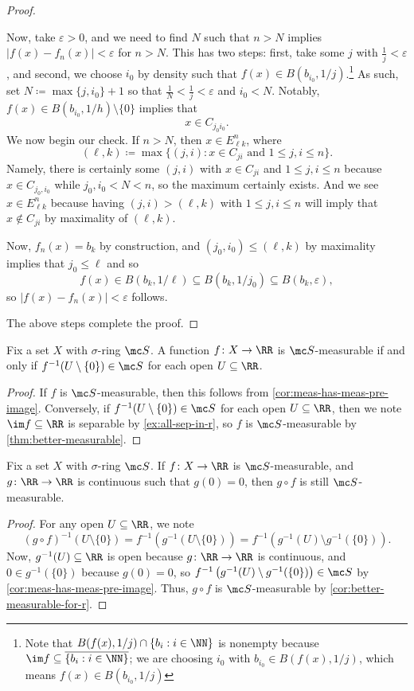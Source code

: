 \documentclass[../notes.tex]{subfiles}
\begin{document}
\begin{proof}
\begin{enumerate}
		Now, take $\varepsilon>0$, and we need to find $N$ such that $n>N$ implies $|f(x)-f_n(x)|<\varepsilon$ for $n>N$. This has two steps: first, take some $j$ with $\frac1j<\varepsilon$, and second, we choose $i_0$ by density such that $f(x)\in B(b_{i_0},1/j)$.\footnote{Note that $B(f(x),1/j)\cap\{b_i:i\in\NN\}$ is nonempty because $\im f\subseteq\overline{\{b_i:i\in\NN\}}$; we are choosing $i_0$ with $b_{i_0}\in B(f(x),1/j)$, which means $f(x)\in B(b_{i_0},1/j)$} As such, set $N\coloneqq\max\{j,i_0\}+1$ so that $\frac1N<\frac1j<\varepsilon$ and $i_0<N$. Notably, $f(x)\in B(b_{i_0},1/h)\setminus\{0\}$ implies that
		\[x\in C_{j_0i_0}.\]
		We now begin our check. If $n>N$, then $x\in E^{n}_{\ell k}$, where
		\[(\ell,k)\coloneqq\max\{(j,i):x\in C_{ji}\text{ and }1\le j,i\le n\}.\]
		Namely, there is certainly some $(j,i)$ with $x\in C_{ji}$ and $1\le j,i\le n$ because $x\in C_{j_0,i_0}$ while $j_0,i_0<N<n$, so the maximum certainly exists. And we see $x\in E^n_{\ell k}$ because having $(j,i)>(\ell,k)$ with $1\le j,i\le n$ will imply that $x\notin C_{ji}$ by maximality of $(\ell,k)$.

		Now, $f_n(x)=b_k$ by construction, and $(j_0,i_0)\le(\ell,k)$ by maximality implies that $j_0\le\ell$ and so
		\[f(x)\in B(b_k,1/\ell)\subseteq B(b_k,1/j_0)\subseteq B(b_k,\varepsilon),\]
		so $|f(x)-f_n(x)|<\varepsilon$ follows.
	\end{enumerate}
	The above steps complete the proof.
\end{proof}
\begin{corollary} \label{cor:better-measurable-for-r}
	Fix a set $X$ with $\sigma$-ring $\mc S$. A function $f\colon X\to\RR$ is $\mc S$-measurable if and only if $f^{-1}(U\setminus\{0\})\in\mc S$ for each open $U\subseteq\RR$.
\end{corollary}
\begin{proof}
	If $f$ is $\mc S$-measurable, then this follows from \autoref{cor:meas-has-meas-pre-image}. Conversely, if $f^{-1}(U\setminus\{0\})\in\mc S$ for each open $U\subseteq\RR$, then we note $\im f\subseteq\RR$ is separable by \autoref{ex:all-sep-in-r}, so $f$ is $\mc S$-measurable by \autoref{thm:better-measurable}.
\end{proof}
\begin{corollary} \label{cor:compose-cont-is-meas}
	Fix a set $X$ with $\sigma$-ring $\mc S$. If $f\colon X\to\RR$ is $\mc S$-measurable, and $g\colon\RR\to\RR$ is continuous such that $g(0)=0$, then $g\circ f$ is still $\mc S$-measurable.
\end{corollary}
\begin{proof}
	For any open $U\subseteq\RR$, we note
	\[(g\circ f)^{-1}(U\setminus\{0\})=f^{-1}\left(g^{-1}(U\setminus\{0\})\right)=f^{-1}\left(g^{-1}(U)\setminus g^{-1}(\{0\})\right).\]
	Now, $g^{-1}(U)\subseteq\RR$ is open because $g\colon\RR\to\RR$ is continuous, and $0\in g^{-1}(\{0\})$ because $g(0)=0$, so $f^{-1}\left(g^{-1}(U)\setminus g^{-1}(\{0\})\right)\in\mc S$ by \autoref{cor:meas-has-meas-pre-image}. Thus, $g\circ f$ is $\mc S$-measurable by \autoref{cor:better-measurable-for-r}.
\end{proof}
\end{document}
